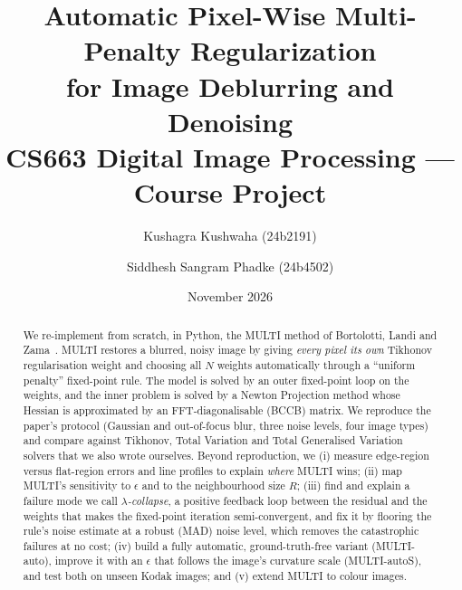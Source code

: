 \documentclass[10pt,a4paper]{article}
\title{\textbf{Automatic Pixel-Wise Multi-Penalty Regularization\\for Image Deblurring and Denoising}\\[4pt]
\large CS663 Digital Image Processing --- Course Project}
\author{Kushagra Kushwaha (24b2191) \and Siddhesh Sangram Phadke (24b4502)}
\date{November 2026}
\begin{document}
\maketitle

\begin{abstract}
\noindent
We re-implement from scratch, in Python, the MULTI method of Bortolotti, Landi
and Zama~\cite{multi}. MULTI restores a blurred, noisy image by giving
\emph{every pixel its own} Tikhonov regularisation weight and choosing all $N$
weights automatically through a ``uniform penalty'' fixed-point rule. The model
is solved by an outer fixed-point loop on the weights, and the inner problem is
solved by a Newton Projection method whose Hessian is approximated by an
FFT-diagonalisable (BCCB) matrix. We reproduce the paper's protocol (Gaussian and
out-of-focus blur, three noise levels, four image types) and compare against
Tikhonov, Total Variation and Total Generalised Variation solvers that we also
wrote ourselves. Beyond reproduction, we
(i) measure edge-region versus flat-region errors and line profiles to explain
\emph{where} MULTI wins;
(ii) map MULTI's sensitivity to $\epsilon$ and to the neighbourhood size $R$;
(iii) find and explain a failure mode we call \emph{$\lambda$-collapse}, a
positive feedback loop between the residual and the weights that makes the
fixed-point iteration semi-convergent, and fix it by flooring the rule's noise
estimate at a robust (MAD) noise level, which removes the catastrophic failures at no cost;
(iv) build a fully automatic, ground-truth-free variant (MULTI-auto), improve it with an
$\epsilon$ that follows the image's curvature scale (MULTI-autoS), and test both on unseen
Kodak images; and
(v) extend MULTI to colour images.
\end{abstract}











\clearpage

\end{document}
